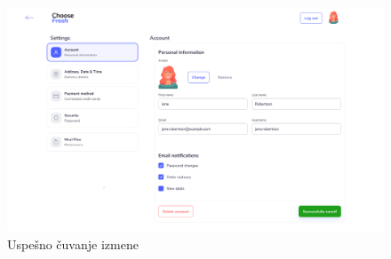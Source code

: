 \begin{figure}[H]
	\begin{center}
		\includegraphics[width=\textwidth]{UI/account_settings_success.png}
    		\caption{Uspešno čuvanje izmene}
    \label{fig:AccountSettingsSuccess}
    \end{center}
\end{figure}